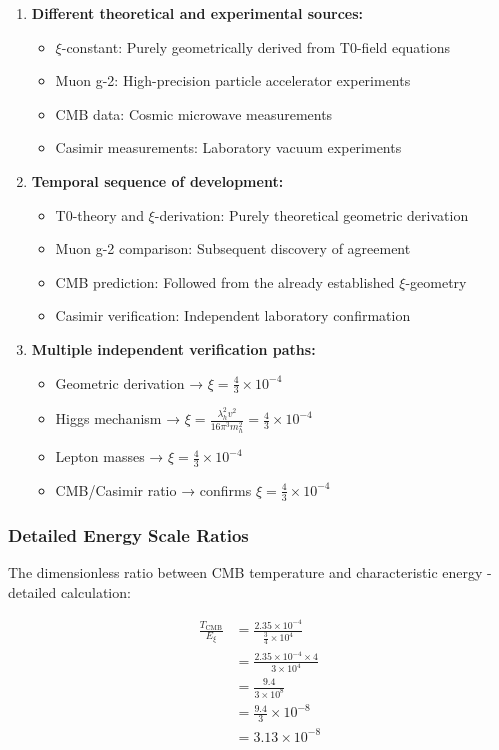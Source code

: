 	\begin{enumerate}
		\item \textbf{Different theoretical and experimental sources:}
		\begin{itemize}
			\item $\xi$-constant: Purely geometrically derived from T0-field equations
			\item Muon g-2: High-precision particle accelerator experiments
			\item CMB data: Cosmic microwave measurements
			\item Casimir measurements: Laboratory vacuum experiments
		\end{itemize}
		
		\item \textbf{Temporal sequence of development:}
		\begin{itemize}
			\item T0-theory and $\xi$-derivation: Purely theoretical geometric derivation
			\item Muon g-2 comparison: Subsequent discovery of agreement
			\item CMB prediction: Followed from the already established $\xi$-geometry
			\item Casimir verification: Independent laboratory confirmation
		\end{itemize}
		
		\item \textbf{Multiple independent verification paths:}
		\begin{itemize}
			\item Geometric derivation → $\xi = \frac{4}{3} \times 10^{-4}$
			\item Higgs mechanism → $\xi = \frac{\lambda_h^2 v^2}{16\pi^3 m_h^2} = \frac{4}{3} \times 10^{-4}$
			\item Lepton masses → $\xi = \frac{4}{3} \times 10^{-4}$
			\item CMB/Casimir ratio → confirms $\xi = \frac{4}{3} \times 10^{-4}$
		\end{itemize}
	\end{enumerate}
	
	\subsubsection{Detailed Energy Scale Ratios}
	
	The dimensionless ratio between CMB temperature and characteristic energy - detailed calculation:
	
	\begin{align}
		\frac{T_{\text{CMB}}}{E_\xi} &= \frac{2.35 \times 10^{-4}}{\frac{3}{4} \times 10^4} \\
		&= \frac{2.35 \times 10^{-4} \times 4}{3 \times 10^4} \\
		&= \frac{9.4}{3 \times 10^8} \\
		&= \frac{9.4}{3} \times 10^{-8} \\
		&= 3.13 \times 10^{-8}
	\end{align}
	
